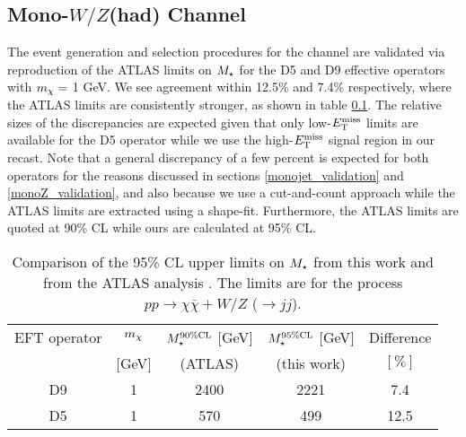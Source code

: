 \subsection{Mono-$W/Z$(had) Channel}
\label{monoWZ_validation}

The event generation and selection procedures for the \monoWZ channel are validated via reproduction of the ATLAS limits on $M_{\star}$ for the D5 and D9 effective operators with $m_{\chi} = $ 1 GeV. We see agreement within 12.5\% and 7.4\% respectively, where the ATLAS limits are consistently stronger, as shown in table \ref{monoWZ_validation}. The relative sizes of the discrepancies are expected given that only low-$E_{\mathrm{T}}^{\mathrm{miss}}$ limits are available for the D5 operator while we use the high-$E_{\mathrm{T}}^{\mathrm{miss}}$ signal region in our recast. Note that a general discrepancy of a few percent is expected for both operators for the reasons discussed in sections \ref{monojet_validation} and \ref{monoZ_validation}, and also because we use a cut-and-count approach while the ATLAS limits are extracted using a shape-fit. Furthermore, the ATLAS limits are quoted at 90\% CL while ours are calculated at 95\% CL.

\begin{table}
\begin{center}
\begin{tabular}{ c | c | c | c | c }
\hline
\hline
EFT operator & $m_{\chi}$ & $M_{\star}^{90\%\mathrm{CL}}$ $[$GeV$]$ & $M_{\star}^{95\%\mathrm{CL}}$ $[$GeV$]$  & Difference \T \\
&$[$GeV$]$ & (ATLAS) & (this work) & $[\%]$ \B \\
\hline
D9 & 1 & 2400 & 2221 & 7.4 \\
D5 & 1 & 570 & 499 & 12.5 \\
\hline
\hline
\end{tabular}
\end{center}
\caption{Comparison of the 95\% CL upper limits on $M_{\star}$ from this work and from the ATLAS \monoWZ analysis \cite{Aad:2013monoWZ}. The limits are for the process $pp \rightarrow \chi \bar{\chi} + W/Z$ ($\rightarrow jj$).}
\label{tab:monoWZvalidation}
\end{table}
